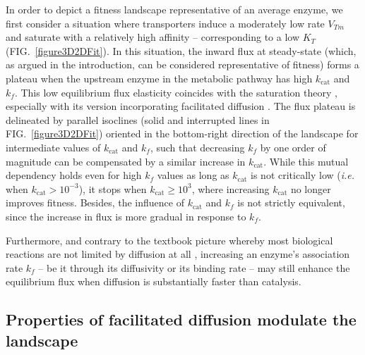\documentclass[nogrid,crop,final]{MBE2}%
\begin{document}
In order to depict a fitness landscape representative of an average enzyme, we first consider a situation where transporters induce a moderately low rate $V_{Tm}$ and saturate with a relatively high affinity -- corresponding to a low $K_T$ (FIG.~\ref{figure3D2DFit}). In this situation, the inward flux at steady-state (which, as argued in the introduction, can be considered representative of fitness) forms a plateau when the upstream enzyme in the metabolic pathway has high $k_\text{cat}$ and $k_f$. This low equilibrium flux elasticity coincides with the saturation theory \citep{Wright34, Kacser73,Hartl85,Dykhuizen87,Dean95,Yi19}, especially with its version incorporating facilitated diffusion \citep{Kuile94,Dean95}. The flux plateau is delineated by parallel isoclines (solid and interrupted lines in FIG.~\ref{figure3D2DFit}) oriented in the bottom-right direction of the landscape for intermediate values of $k_\text{cat}$ and $k_f$, such that decreasing $k_f$ by one order of magnitude can be compensated by a similar increase in $k_\text{cat}$. While this mutual dependency holds even for high $k_f$ values as long as $k_\text{cat}$ is not critically low (\textit{i.e.} when $k_\text{cat}>10^{-3}$), it stops when $k_\text{cat}\geq 10^3$, where increasing $k_\text{cat}$ no longer improves fitness. 
Besides, the influence of $k_\text{cat}$ and $k_f$ is not strictly equivalent, since the increase in flux is more gradual in response to $k_f$. 
 
Furthermore, and contrary to the textbook picture whereby most biological reactions are not limited by diffusion at all \citep{Bar-Even11,Sweetlove18}, increasing an enzyme's association rate $k_f$ – be it through its diffusivity or its binding rate – may still enhance the equilibrium flux when diffusion is substantially faster than catalysis.

\subsection{Properties of facilitated diffusion modulate the landscape}
\end{document}
